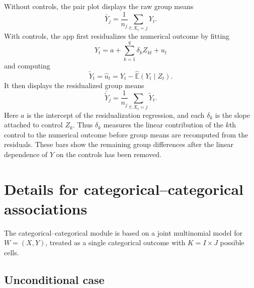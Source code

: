 \documentclass[11pt]{article}
\begin{document}
\begin{appendix}
Without controls, the pair plot displays the raw group means
\begin{equation}
\bar{Y}_j = \frac{1}{n_j}\sum_{t:X_t=j} Y_t.
\label{eq:app-group-means}
\end{equation}
With controls, the app first residualizes the numerical outcome by fitting
\begin{equation}
Y_t = a + \sum_{k=1}^{q} \delta_k Z_{kt} + u_t
\label{eq:app-y-on-z}
\end{equation}
and computing
\begin{equation}
\tilde{Y}_t = \hat{u}_t = Y_t - \widehat{\mathbb{E}}(Y_t \mid Z_t).
\label{eq:app-y-resid}
\end{equation}
It then displays the residualized group means
\begin{equation}
\bar{\tilde{Y}}_j
=
\frac{1}{n_j}\sum_{t:X_t=j}\tilde{Y}_t.
\label{eq:app-resid-means}
\end{equation}
Here $a$ is the intercept of the residualization regression, and each
$\delta_k$ is the slope attached to control $Z_k$. Thus $\delta_k$ measures the
linear contribution of the $k$th control to the numerical outcome before group
means are recomputed from the residuals.
These bars show the remaining group differences after the linear dependence of
$Y$ on the controls has been removed.

\section{Details for categorical--categorical associations}
\label{app:catcat}

The categorical--categorical module is based on a joint multinomial model for
$W = (X, Y)$, treated as a single categorical outcome with
$K = I \times J$ possible cells.

\subsection{Unconditional case}


\end{appendix}
\end{document}
